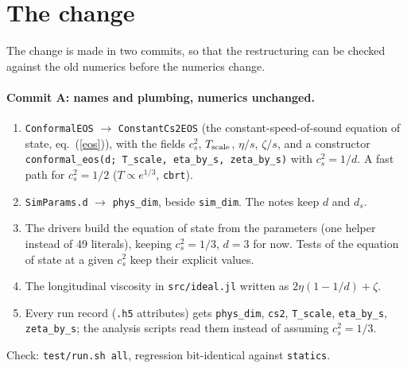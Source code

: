 \documentclass[11pt,aps,preprint,nofootinbib,superscriptaddress,tightenlines]{revtex4-2}
\def\Eq#1{eq.~(\ref{#1})}
\let\oldparagraph\paragraph
\renewcommand{\paragraph}{\par\bigskip\oldparagraph}
\begin{document}
\section{The change}

The change is made in two commits, so that the restructuring can be checked against the old numerics before the numerics change.

\paragraph{Commit A: names and plumbing, numerics unchanged.}
\begin{enumerate}
\item \texttt{ConformalEOS} $\to$ \texttt{ConstantCs2EOS} (the constant-speed-of-sound equation of state, \Eq{eos}), with the fields
  $c_s^2$, $T_{\rm scale}$, $\eta/s$, $\zeta/s$, and a constructor \texttt{conformal\_eos(d; T\_scale, eta\_by\_s, zeta\_by\_s)} with
  $c_s^2=1/d$.  A fast path for $c_s^2=1/2$ ($T\propto e^{1/3}$, \texttt{cbrt}).
\item \texttt{SimParams.d} $\to$ \texttt{phys\_dim}, beside \texttt{sim\_dim}.  The notes keep $d$ and $d_s$.
\item The drivers build the equation of state from the parameters (one helper instead of 49 literals), keeping $c_s^2=1/3$, $d=3$ for
  now.  Tests of the equation of state at a given $c_s^2$ keep their explicit values.
\item The longitudinal viscosity in \texttt{src/ideal.jl} written as $2\eta(1-1/d)+\zeta$.
\item Every run record (\texttt{.h5} attributes) gets \texttt{phys\_dim}, \texttt{cs2}, \texttt{T\_scale}, \texttt{eta\_by\_s},
  \texttt{zeta\_by\_s}; the analysis scripts read them instead of assuming $c_s^2=1/3$.
\end{enumerate}
Check: \texttt{test/run.sh all}, regression bit-identical against \texttt{statics}.
\end{document}
